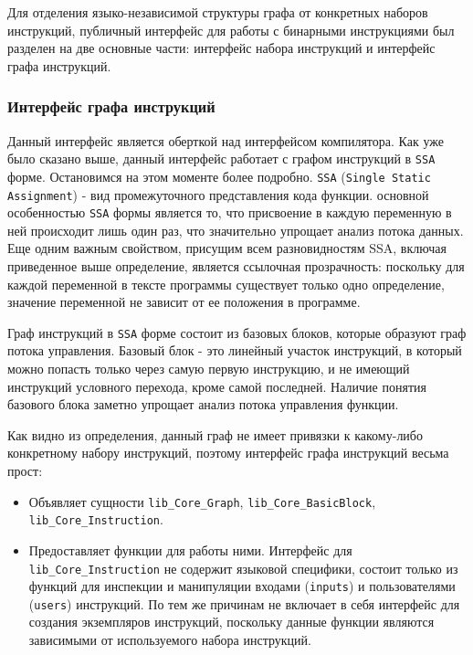 Для отделения языко-независимой структуры графа от конкретных наборов инструкций, публичный интерфейс для работы с бинарными инструкциями был разделен на две основные части: интерфейс набора инструкций и интерфейс графа инструкций.

\subsubsection{Интерфейс графа инструкций}

Данный интерфейс является оберткой над интерфейсом компилятора. Как уже было сказано выше, данный интерфейс работает с графом инструкций в \texttt{SSA} форме. Остановимся на этом моменте более подробно. \texttt{SSA} (\texttt{Single Static Assignment}) - вид промежуточного представления кода функции. основной особенностью \texttt{SSA} формы является то, что присвоение в каждую переменную в ней происходит лишь один раз, что значительно упрощает анализ потока данных. Еще одним важным свойством, присущим всем разновидностям SSA, включая приведенное выше определение, является ссылочная прозрачность: поскольку для каждой переменной в тексте программы существует только одно определение, значение переменной не зависит от ее положения в программе.

Граф инструкций в \texttt{SSA} форме состоит из базовых блоков, которые образуют граф потока управления. Базовый блок - это линейный участок инструкций, в который можно попасть только через самую первую инструкцию, и не имеющий инструкций условного перехода, кроме самой последней. Наличие понятия базового блока заметно упрощает анализ потока управления функции.

Как видно из определения, данный граф не имеет привязки к какому-либо конкретному набору инструкций, поэтому интерфейс графа инструкций весьма прост:

\begin{itemize}
    \item Объявляет сущности \texttt{lib\_Core\_Graph}, \texttt{lib\_Core\_BasicBlock}, \texttt{lib\_Core\_Instruction}.
    \item Предоставляет функции для работы ними. Интерфейс для \texttt{lib\_Core\_Instruction} не содержит языковой специфики, состоит только из функций для инспекции и манипуляции входами (\texttt{inputs}) и пользователями (\texttt{users}) инструкций. По тем же причинам не включает в себя интерфейс для создания экземпляров инструкций, поскольку данные функции являются зависимыми от используемого набора инструкций.
\end{itemize}

